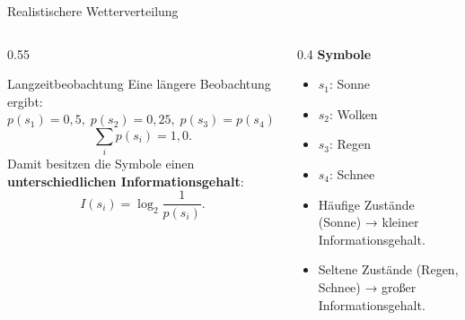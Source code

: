 \begin{frame}{Realistischere Wetterverteilung}

\begin{columns}

\begin{column}{0.55\textwidth}

\begin{block}{Langzeitbeobachtung}
Eine längere Beobachtung ergibt:
$ p(s_1) = 0{,}5,\; p(s_2) = 0{,}25,\; p(s_3) = p(s_4) = 0{,}125$
\[
\sum_i p(s_i) = 1{,}0.
\]
Damit besitzen die Symbole einen \textbf{unterschiedlichen Informationsgehalt}:
\[
I(s_i) = \log_2 \frac{1}{p(s_i)}.
\]
\end{block}



\end{column}

\begin{column}{0.4\textwidth}
\textbf{Symbole}
\begin{itemize}
  \item \(s_1\): Sonne
  \item \(s_2\): Wolken
  \item \(s_3\): Regen
  \item \(s_4\): Schnee
\end{itemize}
\bigskip
\begin{itemize}
  \item Häufige Zustände (Sonne) → kleiner Informationsgehalt.
  \item Seltene Zustände (Regen, Schnee) → großer Informationsgehalt.
\end{itemize}

\end{column}

\end{columns}

\end{frame}


